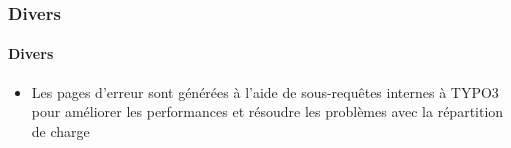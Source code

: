 %

\begin{frame}[fragile]
	\frametitle{Divers}
	\framesubtitle{Divers}


	\begin{itemize}
		\item Les pages d'erreur sont générées à l'aide de sous-requêtes internes à TYPO3
			pour améliorer les performances et résoudre les problèmes avec la répartition de charge
	\end{itemize}

\end{frame}

